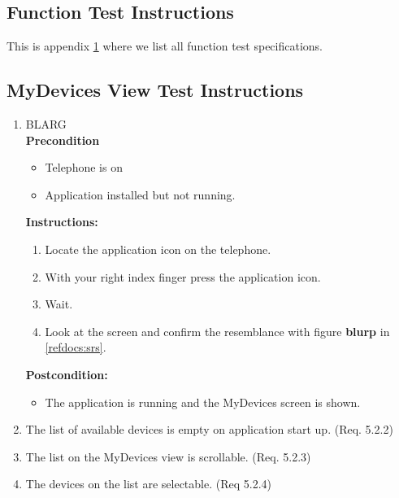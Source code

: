 \documentclass[a4paper]{article}
\newlength{\testlabellength}
\newenvironment{testlist}{\begin{enumerate}[label=\bfseries Instruction \thesubsection.\arabic* , labelindent=0pt, labelwidth=\testlabellength , leftmargin=2cm]}{\end{enumerate}}
\newenvironment{precondition}{
{\color{white}BLARG}\\ 
\textbf{Precondition}
\begin{itemize}[labelindent=0cm, labelwidth=2cm , leftmargin=1cm]
}
{\end{itemize}}
\newenvironment{instruction}{
\textbf{Instructions:}
\begin{enumerate}[label=\bfseries  \arabic*., labelindent=0cm, labelwidth=2cm , leftmargin=1cm]
}
{\end{enumerate}}
\newenvironment{postcondition}{
\textbf{Postcondition:}
\begin{itemize}[labelindent=0cm, labelwidth=2cm , leftmargin=1cm]
}
{\end{itemize}}
\begin{document}
\newpage
\begin{appendices}

\section{Function Test Instructions} \label{appendix:section:functiontest}
This is appendix \ref{appendix:section:functiontest} where we list all function test specifications.

\subsection{MyDevices View Test Instructions}
\begin{testlist}

    \item \begin{precondition}
    			\item Telephone is on
    			\item Application installed but not running.
    			\end{precondition}
    			\begin{instruction}
    				\item Locate the application icon on the telephone.
    				\item With your right index finger press the application icon.
	    			\item Wait.
    				\item Look at the screen and confirm the resemblance with figure \textbf{blurp} in \ref{refdocs:srs}.
    			\end{instruction}
    			\begin{postcondition}
    				\item The application is running and the MyDevices screen is shown.
    			\end{postcondition}
    
	\item The list of available devices is empty on application start up. (Req. 5.2.2)
   
    \item The list on the MyDevices view is scrollable. (Req. 5.2.3)
   
    \item The devices on the list are selectable. (Req 5.2.4)
   

\end{testlist}
\end{appendices}
\end{document}
